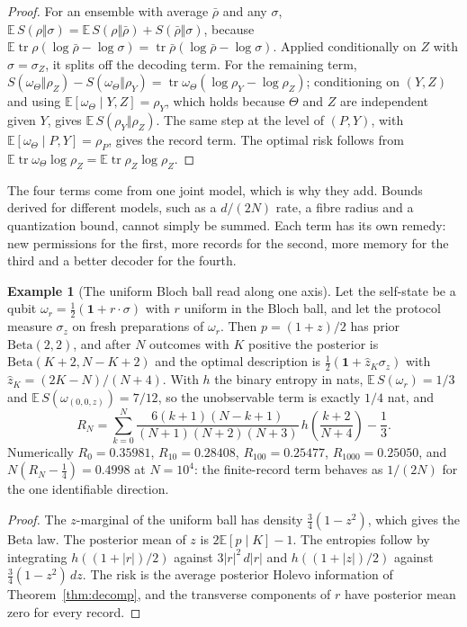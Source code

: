 \documentclass[12pt]{article}
\theoremstyle{definition}
\newtheorem{example}[theorem]{Example}
\theoremstyle{remark}
\newcommand{\E}{\mathbb E}
\newcommand{\tr}{\operatorname{tr}}
\begin{document}
\begin{proof}
For an ensemble with average $\bar\rho$ and any $\sigma$, $\E\,S(\rho\Vert\sigma)=\E\,S(\rho\Vert\bar\rho)+S(\bar\rho\Vert\sigma)$, because $\E\tr\rho(\log\bar\rho-\log\sigma)=\tr\bar\rho(\log\bar\rho-\log\sigma)$. Applied conditionally on $Z$ with $\sigma=\sigma_Z$, it splits off the decoding term. For the remaining term, $S(\omega_\Theta\Vert\rho_Z)-S(\omega_\Theta\Vert\rho_Y)=\tr\omega_\Theta(\log\rho_Y-\log\rho_Z)$; conditioning on $(Y,Z)$ and using $\E[\omega_\Theta\mid Y,Z]=\rho_Y$, which holds because $\Theta$ and $Z$ are independent given $Y$, gives $\E\,S(\rho_Y\Vert\rho_Z)$. The same step at the level of $(P,Y)$, with $\E[\omega_\Theta\mid P,Y]=\rho_P$, gives the record term. The optimal risk follows from $\E\tr\omega_\Theta\log\rho_Z=\E\tr\rho_Z\log\rho_Z$.
\end{proof}

The four terms come from one joint model, which is why they add. Bounds derived for different models, such as a $d/(2N)$ rate, a fibre radius and a quantization bound, cannot simply be summed. Each term has its own remedy: new permissions for the first, more records for the second, more memory for the third and a better decoder for the fourth.

\begin{example}[The uniform Bloch ball read along one axis]\label{ex:bloch}
Let the self-state be a qubit $\omega_r=\tfrac12(\mathbf 1+r\cdot\sigma)$ with $r$ uniform in the Bloch ball, and let the protocol measure $\sigma_z$ on fresh preparations of $\omega_r$. Then $p=(1+z)/2$ has prior $\mathrm{Beta}(2,2)$, and after $N$ outcomes with $K$ positive the posterior is $\mathrm{Beta}(K+2,N-K+2)$ and the optimal description is $\tfrac12(\mathbf 1+\hat z_K\sigma_z)$ with $\hat z_K=(2K-N)/(N+4)$. With $h$ the binary entropy in nats, $\E\,S(\omega_r)=1/3$ and $\E\,S(\omega_{(0,0,z)})=7/12$, so the unobservable term is exactly $1/4$ nat, and
\begin{equation}\label{eq:RN}
R_N=\sum_{k=0}^N\frac{6(k+1)(N-k+1)}{(N+1)(N+2)(N+3)}\,h\!\left(\frac{k+2}{N+4}\right)-\frac13 .
\end{equation}
Numerically $R_0=0.35981$, $R_{10}=0.28408$, $R_{100}=0.25477$, $R_{1000}=0.25050$, and $N(R_N-\tfrac14)=0.4998$ at $N=10^4$: the finite-record term behaves as $1/(2N)$ for the one identifiable direction.
\end{example}

\begin{proof}
The $z$-marginal of the uniform ball has density $\tfrac34(1-z^2)$, which gives the Beta law. The posterior mean of $z$ is $2\E[p\mid K]-1$. The entropies follow by integrating $h((1+|r|)/2)$ against $3|r|^2\,d|r|$ and $h((1+|z|)/2)$ against $\tfrac34(1-z^2)\,dz$. The risk is the average posterior Holevo information of Theorem~\ref{thm:decomp}, and the transverse components of $r$ have posterior mean zero for every record.
\end{proof}
\end{document}
